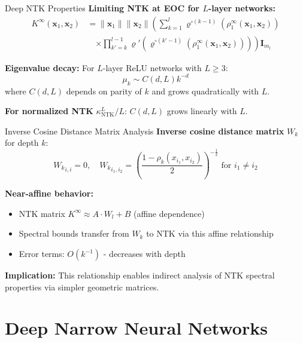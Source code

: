 \documentclass{beamer}
\begin{document}
\begin{frame}{Deep NTK Properties}
\textbf{Limiting NTK at EOC for $L$-layer networks:}
\begin{align*}
K^{\infty}(\mathbf{x}_1, \mathbf{x}_2) &= \|\mathbf{x}_1\| \|\mathbf{x}_2\| \left( \sum_{k=1}^l \varrho^{\circ (k-1)}\left(\rho_1^{\infty}(\mathbf{x}_1, \mathbf{x}_2)\right) \right. \\
&\quad \left. \times \prod_{k'=k}^{l-1} \varrho'\left(\varrho^{\circ (k'-1)}\left(\rho_1^{\infty}(\mathbf{x}_1, \mathbf{x}_2)\right)\right) \right) \mathbf{I}_{m_l}
\end{align*}

\textbf{Eigenvalue decay:} For $L$-layer ReLU networks with $L \geq 3$:
\[ \mu_k \sim C(d, L)k^{-d} \]
where $C(d, L)$ depends on parity of $k$ and grows quadratically with $L$.

\textbf{For normalized NTK} $\kappa^L_{\text{NTK}}/L$: $C(d, L)$ grows linearly with $L$.
\end{frame}

\begin{frame}{Inverse Cosine Distance Matrix Analysis}
\textbf{Inverse cosine distance matrix} $W_k$ for depth $k$:
\[ {W_k}_{i,i} = 0, \quad {W_k}_{i_1,i_2} = \left( \frac{1 - \rho_k(x_{i_1},x_{i_2})}{2} \right)^{-\frac{1}{2}} \text{ for } i_1 \neq i_2 \]

\textbf{Near-affine behavior:}
\begin{itemize}
\item NTK matrix $K^{\infty} \approx A \cdot W_l + B$ (affine dependence)
\item Spectral bounds transfer from $W_k$ to NTK via this affine relationship
\item Error terms: $O(k^{-1})$ - decreases with depth
\end{itemize}

\textbf{Implication:} This relationship enables indirect analysis of NTK spectral properties via simpler geometric matrices.
\end{frame}

\section{Deep Narrow Neural Networks}
\end{document}
